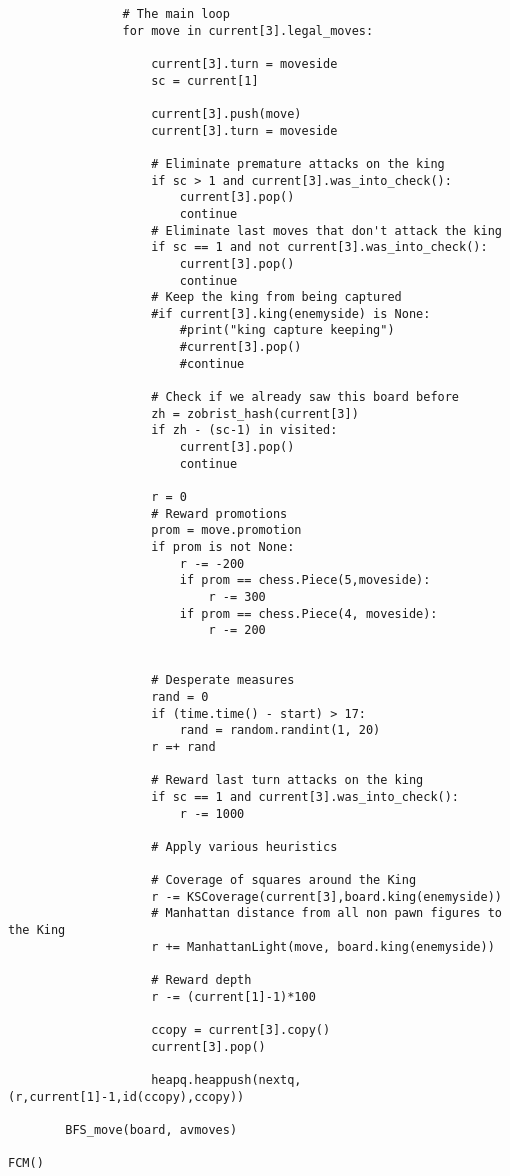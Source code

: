 \documentclass[runningheads]{llncs}
\begin{document}
\begin{lstlisting}
                # The main loop
                for move in current[3].legal_moves:

                    current[3].turn = moveside
                    sc = current[1]

                    current[3].push(move)
                    current[3].turn = moveside

                    # Eliminate premature attacks on the king
                    if sc > 1 and current[3].was_into_check():
                        current[3].pop()
                        continue
                    # Eliminate last moves that don't attack the king
                    if sc == 1 and not current[3].was_into_check():
                        current[3].pop()
                        continue
                    # Keep the king from being captured
                    #if current[3].king(enemyside) is None:
                        #print("king capture keeping")
                        #current[3].pop()
                        #continue

                    # Check if we already saw this board before
                    zh = zobrist_hash(current[3])
                    if zh - (sc-1) in visited:
                        current[3].pop()
                        continue

                    r = 0
                    # Reward promotions
                    prom = move.promotion
                    if prom is not None:
                        r -= -200
                        if prom == chess.Piece(5,moveside):
                            r -= 300
                        if prom == chess.Piece(4, moveside):
                            r -= 200


                    # Desperate measures
                    rand = 0
                    if (time.time() - start) > 17:
                        rand = random.randint(1, 20)
                    r =+ rand

                    # Reward last turn attacks on the king
                    if sc == 1 and current[3].was_into_check():
                        r -= 1000

                    # Apply various heuristics

                    # Coverage of squares around the King
                    r -= KSCoverage(current[3],board.king(enemyside))
                    # Manhattan distance from all non pawn figures to the King
                    r += ManhattanLight(move, board.king(enemyside))

                    # Reward depth
                    r -= (current[1]-1)*100

                    ccopy = current[3].copy()
                    current[3].pop()

                    heapq.heappush(nextq, (r,current[1]-1,id(ccopy),ccopy))

        BFS_move(board, avmoves)

FCM()



\end{lstlisting}
\end{document}

